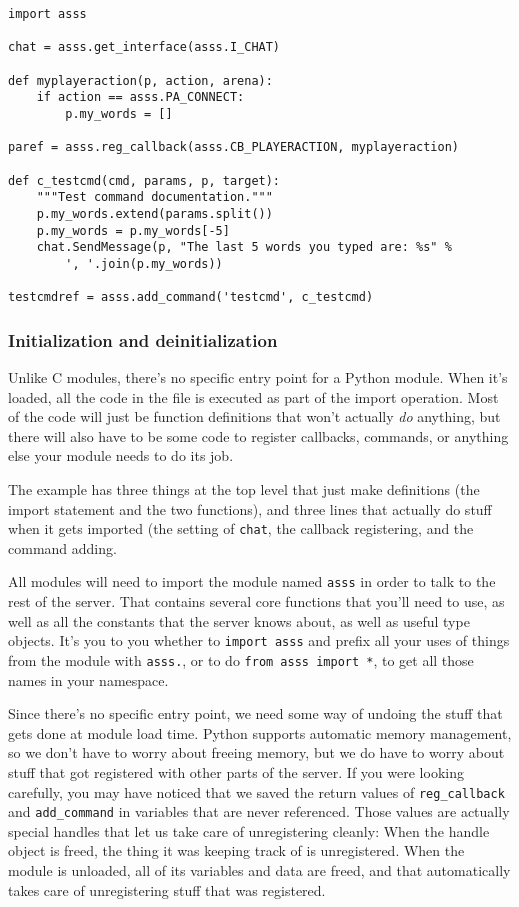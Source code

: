 \documentclass{article}
\begin{document}
\begin{verbatim}
import asss

chat = asss.get_interface(asss.I_CHAT)

def myplayeraction(p, action, arena):
    if action == asss.PA_CONNECT:
        p.my_words = []

paref = asss.reg_callback(asss.CB_PLAYERACTION, myplayeraction)

def c_testcmd(cmd, params, p, target):
    """Test command documentation."""
    p.my_words.extend(params.split())
    p.my_words = p.my_words[-5]
    chat.SendMessage(p, "The last 5 words you typed are: %s" %
        ', '.join(p.my_words))

testcmdref = asss.add_command('testcmd', c_testcmd)
\end{verbatim}


\subsubsection{Initialization and deinitialization}

Unlike C modules, there's no specific entry point for a Python module.
When it's loaded, all the code in the file is executed as part of the
import operation. Most of the code will just be function definitions
that won't actually \emph{do} anything, but there will also have to be
some code to register callbacks, commands, or anything else your module
needs to do its job.

The example has three things at the top level that just make definitions
(the import statement and the two functions), and three lines that
actually do stuff when it gets imported (the setting of \verb/chat/, the
callback registering, and the command adding.

All modules will need to import the module named \verb/asss/ in order to
talk to the rest of the server. That contains several core functions
that you'll need to use, as well as all the constants that the server
knows about, as well as useful type objects. It's you to you whether to
\verb/import asss/ and prefix all your uses of things from the module
with \verb/asss./, or to do \verb/from asss import */, to get all those
names in your namespace.

Since there's no specific entry point, we need some way of undoing the
stuff that gets done at module load time. Python supports automatic
memory management, so we don't have to worry about freeing memory, but
we do have to worry about stuff that got registered with other parts of
the server. If you were looking carefully, you may have noticed that we
saved the return values of \verb/reg_callback/ and \verb/add_command/ in
variables that are never referenced. Those values are actually special
handles that let us take care of unregistering cleanly: When the handle
object is freed, the thing it was keeping track of is unregistered. When
the module is unloaded, all of its variables and data are freed, and
that automatically takes care of unregistering stuff that was
registered.
\end{document}
